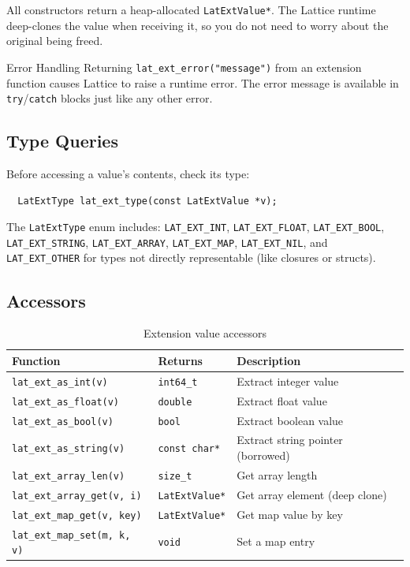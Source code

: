 All constructors return a heap-allocated \lstinline|LatExtValue*|.
The Lattice runtime deep-clones the value when receiving it, so you do not need to worry about the original being freed.

\begin{notebox}{Error Handling}
Returning \lstinline|lat_ext_error("message")| from an extension function causes Lattice to raise a runtime error.
The error message is available in \lstinline|try|/\lstinline|catch| blocks just like any other error.
\end{notebox}

\subsection{Type Queries}

Before accessing a value's contents, check its type:

\begin{verbatim}
  LatExtType lat_ext_type(const LatExtValue *v);
\end{verbatim}

The \lstinline|LatExtType| enum includes: \lstinline|LAT_EXT_INT|, \lstinline|LAT_EXT_FLOAT|, \lstinline|LAT_EXT_BOOL|, \lstinline|LAT_EXT_STRING|, \lstinline|LAT_EXT_ARRAY|, \lstinline|LAT_EXT_MAP|, \lstinline|LAT_EXT_NIL|, and \lstinline|LAT_EXT_OTHER| for types not directly representable (like closures or structs).

\subsection{Accessors}

\begin{table}[h]
\centering
\caption{Extension value accessors}\label{tab:ext-accessors}
\begin{tabular}{@{} l l p{5cm} @{}}
\toprule
\textbf{Function} & \textbf{Returns} & \textbf{Description} \\
\midrule
\lstinline|lat_ext_as_int(v)| & \lstinline|int64_t| & Extract integer value \\
\lstinline|lat_ext_as_float(v)| & \lstinline|double| & Extract float value \\
\lstinline|lat_ext_as_bool(v)| & \lstinline|bool| & Extract boolean value \\
\lstinline|lat_ext_as_string(v)| & \lstinline|const char*| & Extract string pointer (borrowed) \\
\lstinline|lat_ext_array_len(v)| & \lstinline|size_t| & Get array length \\
\lstinline|lat_ext_array_get(v, i)| & \lstinline|LatExtValue*| & Get array element (deep clone) \\
\lstinline|lat_ext_map_get(v, key)| & \lstinline|LatExtValue*| & Get map value by key \\
\lstinline|lat_ext_map_set(m, k, v)| & \lstinline|void| & Set a map entry \\
\bottomrule
\end{tabular}
\end{table}


